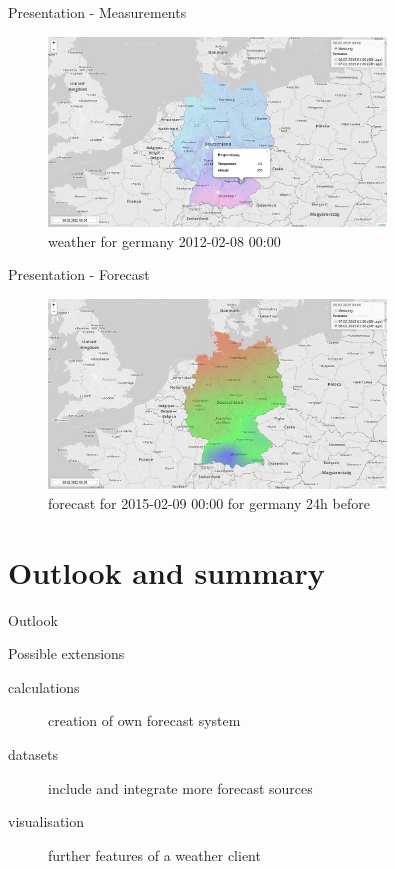 \documentclass[ucs,9pt]{beamer}
\begin{document}
\begin{frame}{Presentation - Measurements}
  \begin{figure}
    \centering
    \includegraphics[width=0.8\textwidth]{images/live_measurement.png}
    \caption{weather for germany 2012-02-08 00:00}
    \label{fig:voronoi}
  \end{figure}
\end{frame}

\begin{frame}{Presentation - Forecast}
  \begin{figure}
    \centering
    \includegraphics[width=0.8\textwidth]{images/live_forecast.png}
    \caption{forecast for 2015-02-09 00:00 for germany 24h before}
    \label{fig:voronoi}
  \end{figure}
\end{frame}

\section{Outlook and summary}
\begin{frame}{Outlook}
		\begin{block}{Possible extensions}
			\begin{description}
				\item [calculations] creation of own forecast system
				\item [datasets] include and integrate more forecast sources
				\item [visualisation] further features of a weather client
			\end{description}
		\end{block}
\end{frame}
\end{document}
